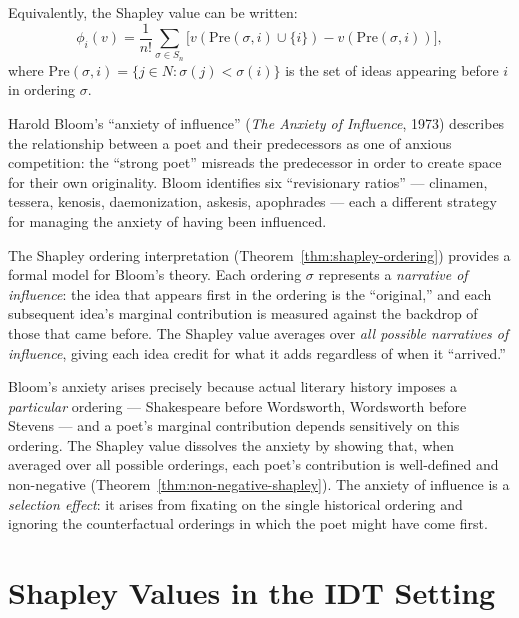 \begin{theorem}
\label{thm:shapley-ordering}
Equivalently, the Shapley value can be written:
\[
  \phi_i(v) = \frac{1}{n!} \sum_{\sigma \in S_n}
  \bigl[v(\text{Pre}(\sigma, i) \cup \{i\}) - v(\text{Pre}(\sigma, i))\bigr],
\]
where $\text{Pre}(\sigma, i) = \{j \in N : \sigma(j) < \sigma(i)\}$ is the
set of ideas appearing before $i$ in ordering $\sigma$.
\end{theorem}

\begin{interpretation}
\label{interp:ch21:bloom_anxiety}
Harold Bloom's ``anxiety of influence'' (\textit{The Anxiety of Influence},
1973) describes the relationship between a poet and their predecessors as
one of anxious competition: the ``strong poet'' misreads the predecessor
in order to create space for their own originality.  Bloom identifies
six ``revisionary ratios'' --- clinamen, tessera, kenosis, daemonization,
askesis, apophrades --- each a different strategy for managing the anxiety
of having been influenced.

The Shapley ordering interpretation (Theorem~\ref{thm:shapley-ordering})
provides a formal model for Bloom's theory.  Each ordering $\sigma$
represents a \emph{narrative of influence}: the idea that appears first
in the ordering is the ``original,'' and each subsequent idea's marginal
contribution is measured against the backdrop of those that came before.
The Shapley value averages over \emph{all possible narratives of influence},
giving each idea credit for what it adds regardless of when it ``arrived.''

Bloom's anxiety arises precisely because actual literary history imposes a
\emph{particular} ordering --- Shakespeare before Wordsworth, Wordsworth
before Stevens --- and a poet's marginal contribution depends sensitively
on this ordering.  The Shapley value dissolves the anxiety by showing
that, when averaged over all possible orderings, each poet's contribution
is well-defined and non-negative (Theorem~\ref{thm:non-negative-shapley}).
The anxiety of influence is a \emph{selection effect}: it arises from
fixating on the single historical ordering and ignoring the counterfactual
orderings in which the poet might have come first.
\end{interpretation}

\section{Shapley Values in the IDT Setting}

